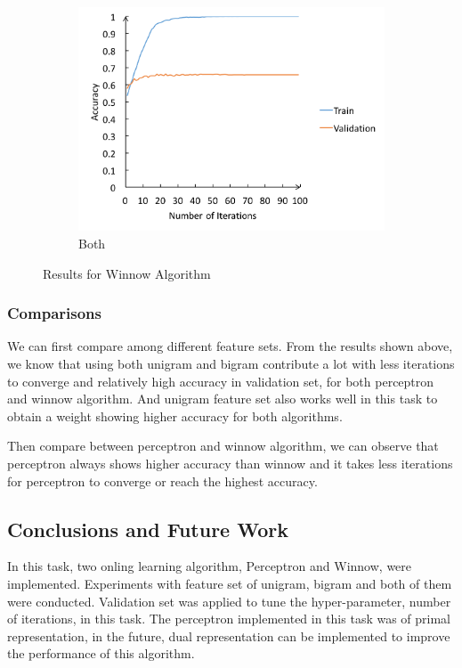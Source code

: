 \documentclass[11pt]{article}
\begin{document}
\begin{figure}
\begin{subfigure}{0.31\textwidth}
\includegraphics[width=\linewidth]{winnow_both.png}
\caption{Both} \label{fig:2c}
\end{subfigure}
\caption{Results for Winnow Algorithm} \label{fig:2}
\end{figure}
\subsubsection{Comparisons}
We can first compare among different feature sets. From the results shown above, we know that using both unigram and bigram contribute a lot with less iterations to converge and relatively high accuracy in validation set, for both perceptron and winnow algorithm. And unigram feature set also works well in this task to obtain a weight showing higher accuracy for both algorithms. 

Then compare between perceptron and winnow algorithm, we can observe that perceptron always shows higher accuracy than winnow and it takes less iterations for perceptron to converge or reach the highest accuracy. 
\subsection{Conclusions and Future Work}
In this task, two onling learning algorithm, Perceptron and Winnow, were implemented. Experiments with feature set of unigram, bigram and both of them were conducted. Validation set was applied to tune the hyper-parameter, number of iterations, in this task. The perceptron implemented in this task was of primal representation, in the future, dual representation can be implemented to improve the performance of this algorithm.
%
%
\end{document}
